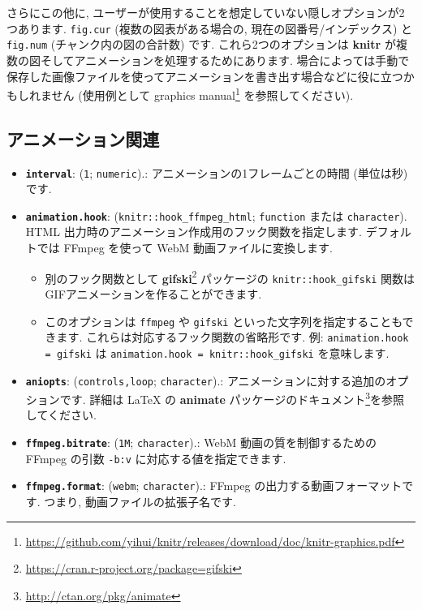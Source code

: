 \documentclass[
  11pt,
  lualatex,
  ja=standard]{bxjsreport}
\providecommand{\tightlist}{%
  \setlength{\itemsep}{0pt}\setlength{\parskip}{0pt}}
\renewcommand{\href}[2]{#2\footnote{\url{#1}}}
\begin{document}
さらにこの他に, ユーザーが使用することを想定していない隠しオプションが2つあります. \texttt{fig.cur} (複数の図表がある場合の, 現在の図番号/インデックス) と \texttt{fig.num} (チャンク内の図の合計数) です. これら2つのオプションは \textbf{knitr} が複数の図そしてアニメーションを処理するためにあります. 場合によっては手動で保存した画像ファイルを使ってアニメーションを書き出す場合などに役に立つかもしれません (使用例として \href{https://github.com/yihui/knitr/releases/download/doc/knitr-graphics.pdf}{graphics manual} を参照してください).

\hypertarget{animation-options}{%
\subsection{アニメーション関連}\label{animation-options}}

\begin{itemize}
\tightlist
\item
  \textbf{\texttt{interval}}: (\texttt{1}; \texttt{numeric}).: アニメーションの1フレームごとの時間 (単位は秒) です.
\item
  \textbf{\texttt{animation.hook}}: (\texttt{knitr::hook\_ffmpeg\_html}; \texttt{function} または \texttt{character}). HTML 出力時のアニメーション作成用のフック関数を指定します. デフォルトでは FFmpeg を使って WebM 動画ファイルに変換します.

  \begin{itemize}
  \tightlist
  \item
    別のフック関数として \href{https://cran.r-project.org/package=gifski}{\textbf{gifski}} パッケージの \texttt{knitr::hook\_gifski} 関数はGIFアニメーションを作ることができます.
  \item
    このオプションは \texttt{\textquotesingle{}ffmpeg\textquotesingle{}} や \texttt{\textquotesingle{}gifski\textquotesingle{}} といった文字列を指定することもできます. これらは対応するフック関数の省略形です. 例: \texttt{animation.hook = \textquotesingle{}gifski\textquotesingle{}} は \texttt{animation.hook = knitr::hook\_gifski} を意味します.
  \end{itemize}
\item
  \textbf{\texttt{aniopts}}: (\texttt{\textquotesingle{}controls,loop\textquotesingle{}}; \texttt{character}).: アニメーションに対する追加のオプションです. 詳細は LaTeX の \href{http://ctan.org/pkg/animate}{\textbf{animate} パッケージのドキュメント}を参照してください.
\item
  \textbf{\texttt{ffmpeg.bitrate}}: (\texttt{1M}; \texttt{character}).: WebM 動画の質を制御するための FFmpeg の引数 \texttt{-b:v} に対応する値を指定できます.
\item
  \textbf{\texttt{ffmpeg.format}}: (\texttt{webm}; \texttt{character}).: FFmpeg の出力する動画フォーマットです. つまり, 動画ファイルの拡張子名です.
\end{itemize}
\end{document}
